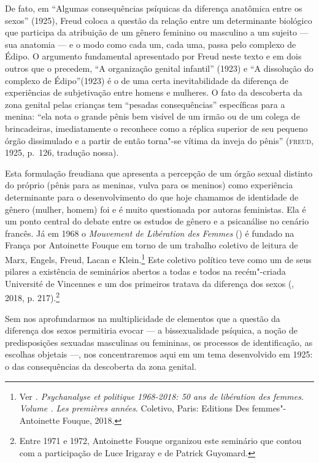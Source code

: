 De fato, em ``Algumas consequências psíquicas da diferença anatômica
entre os sexos'' (1925), Freud coloca a questão da relação entre um
determinante biológico que participa da atribuição de um gênero feminino
ou masculino a um sujeito --- sua anatomia --- e o modo como cada um, cada
uma, passa pelo complexo de Édipo. O argumento fundamental apresentado
por Freud neste texto e em dois outros que o precedem, ``A organização
genital infantil'' (1923) e ``A dissolução do complexo de Édipo''(1923)
é o de uma certa inevitabilidade da diferença de experiências de
subjetivação entre homens e mulheres. O fato da descoberta da zona
genital pelas crianças tem ``pesadas consequências'' específicas para a
menina: ``ela nota o grande pênis bem visível de um irmão ou de um
colega de brincadeiras, imediatamente o reconhece como a réplica
superior de seu pequeno órgão dissimulado e a partir de então torna"-se
vítima da inveja do pênis'' (\textsc{freud}, 1925, p.~126, tradução nossa).

Esta formulação freudiana que apresenta a percepção de um órgão sexual
distinto do próprio (pênis para as meninas, vulva para os meninos) como
experiência determinante para o desenvolvimento do que hoje chamamos de
identidade de gênero (mulher, homem) foi e é muito questionada por
autoras feministas. Ela é um ponto central do debate entre os estudos de
gênero e a psicanálise no cenário francês. Já em 1968 o \emph{Mouvement
de Libération des Femmes} () é fundado na França por Antoinette
Fouque em torno de um trabalho coletivo de leitura de Marx, Engels,
Freud, Lacan e Klein.\footnote{Ver \emph{. Psychanalyse et politique
  1968-2018: 50 ans de libération des femmes. Volume . Les premières
  années}. Coletivo, Paris: Editions Des femmes"-Antoinette Fouque, 2018.}
Este coletivo político teve como um de seus pilares a existência de
seminários abertos a todas e todos na recém"-criada Université de
Vincennes e um dos primeiros tratava da diferença dos sexos (\emph{}, 2018, p. 217).\footnote{Entre 1971 e 1972, Antoinette Fouque organizou este seminário
  que contou com a participação de Luce Irigaray e de Patrick Guyomard.}

Sem nos aprofundarmos na multiplicidade de elementos que a questão da
diferença dos sexos permitiria evocar --- a bissexualidade psíquica, a
noção de predisposições sexuadas masculinas ou femininas, os processos
de identificação, as escolhas objetais ---, nos concentraremos aqui em um
tema desenvolvido em 1925: o das consequências da descoberta da zona
genital.

